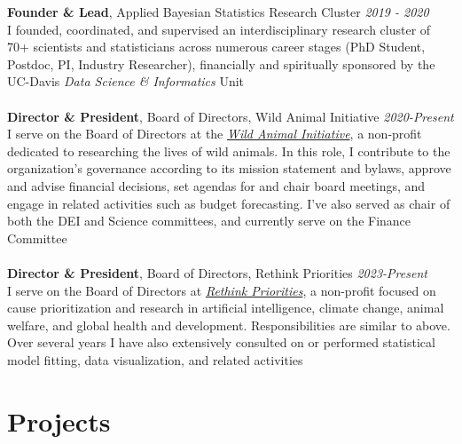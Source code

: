 \documentclass[12pt]{article}
\begin{document}
\textbf{Founder \& Lead}, Applied Bayesian Statistics Research Cluster \hfill \emph{2019 - 2020}\\
I founded, coordinated, and supervised an interdisciplinary research cluster of 70+ scientists and statisticians across numerous career stages (PhD Student, Postdoc, PI, Industry Researcher), financially and spiritually sponsored by the UC-Davis \emph{Data Science \& Informatics} Unit\\\\
\textbf{Director \& President}, Board of Directors, Wild Animal Initiative \hfill \emph{2020-Present}\\
I serve on the Board of Directors at the \textit{\href{https://www.wildanimalinitiative.org/}{Wild Animal Initiative}}, a non-profit dedicated to researching the lives of wild animals. In this role, I contribute to the organization's governance according to its mission statement and bylaws, approve and advise financial decisions, set agendas for and chair board meetings, and engage in related activities such as budget forecasting.  I've also served as chair of both the DEI and Science committees, and currently serve on the Finance Committee\\\\
\textbf{Director \& President}, Board of Directors, Rethink Priorities \hfill \emph{2023-Present}\\
I serve on the Board of Directors at \textit{\href{https://rethinkpriorities.org/}{Rethink Priorities}}, a non-profit focused on cause prioritization and research in artificial intelligence, climate change, animal welfare, and global health and development. Responsibilities are similar to above. Over several years I have also extensively consulted on or performed statistical model fitting, data visualization, and related activities

\section{Projects}
\end{document}
